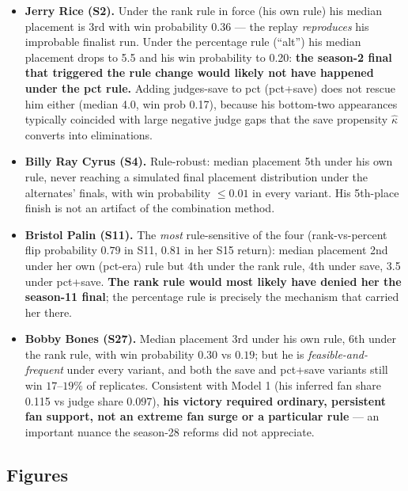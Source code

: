 \documentclass[11pt]{article}
\begin{document}
\begin{itemize}[itemsep=2pt]
  \item \textbf{Jerry Rice (S2).} Under the rank rule in force (his own rule) his median
        placement is 3rd with win probability 0.36 --- the replay \emph{reproduces} his
        improbable finalist run. Under the percentage rule (``alt'') his median placement
        drops to 5.5 and his win probability to 0.20: \textbf{the season-2 final that
        triggered the rule change would likely not have happened under the pct rule.}
        Adding judges-save to pct (pct+save) does not rescue him either (median 4.0, win
        prob 0.17), because his bottom-two appearances typically coincided with large
        negative judge gaps that the save propensity $\hat\kappa$ converts into
        eliminations.
  \item \textbf{Billy Ray Cyrus (S4).} Rule-robust: median placement 5th under his own
        rule, never reaching a simulated final placement distribution under the
        alternates' finals, with win probability $\le 0.01$ in every variant. His 5th-place
        finish is not an artifact of the combination method.
  \item \textbf{Bristol Palin (S11).} The \emph{most} rule-sensitive of the four
        (rank-vs-percent flip probability $0.79$ in S11, $0.81$ in her S15 return):
        median placement 2nd under her own (pct-era) rule but 4th under the rank rule,
        4th under save, 3.5 under pct+save. \textbf{The rank rule would most likely have
        denied her the season-11 final}; the percentage rule is precisely the mechanism
        that carried her there.
  \item \textbf{Bobby Bones (S27).} Median placement 3rd under his own rule, 6th under
        the rank rule, with win probability $0.30$ vs $0.19$; but he is
        \emph{feasible-and-frequent} under every variant, and both the save and pct+save
        variants still win $17$--$19\%$ of replicates. Consistent with Model 1 (his
        inferred fan share 0.115 vs judge share 0.097), \textbf{his victory required
        ordinary, persistent fan support, not an extreme fan surge or a particular
        rule} --- an important nuance the season-28 reforms did not appreciate.
\end{itemize}

\subsection{Figures}
\end{document}
